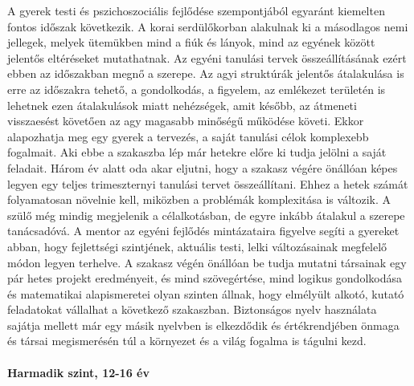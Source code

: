 A gyerek testi és pszichoszociális fejlődése szempontjából egyaránt
kiemelten fontos időszak következik. A korai serdülőkorban alakulnak ki a
másodlagos nemi jellegek, melyek ütemükben mind a fiúk és lányok, mind az
egyének között jelentős eltéréseket mutathatnak. Az egyéni tanulási tervek
összeállításának ezért ebben az időszakban megnő a szerepe. Az agyi struktúrák
jelentős átalakulása is erre az időszakra tehető, a gondolkodás, a figyelem, az
emlékezet területén is lehetnek ezen átalakulások miatt nehézségek, amit
később, az átmeneti visszaesést követően az agy magasabb minőségű működése
követi. Ekkor alapozhatja meg egy gyerek a tervezés, a saját tanulási célok
komplexebb fogalmait. Aki ebbe a szakaszba lép már hetekre előre ki tudja
jelölni a saját feladait. Három év alatt oda akar eljutni, hogy a szakasz
végére önállóan képes legyen egy teljes trimeszternyi tanulási tervet
összeállítani. Ehhez a hetek számát folyamatosan növelnie kell, miközben a
problémák komplexitása is változik. A szülő még mindig megjelenik a
célalkotásban, de egyre inkább átalakul a szerepe tanácsadóvá. A mentor az
egyéni fejlődés mintázataira figyelve segíti a gyereket abban, hogy fejlettségi
szintjének, aktuális testi, lelki változásainak megfelelő módon legyen
terhelve.
A szakasz végén önállóan be tudja mutatni társainak egy pár hetes projekt
eredményeit, és mind szövegértése, mind logikus gondolkodása és matematikai
alapismeretei olyan szinten állnak, hogy elmélyült alkotó, kutató feladatokat
vállalhat a következő szakaszban. Biztonságos nyelv használata sajátja mellett
már egy másik nyelvben is elkezdődik és értékrendjében önmaga és társai
megismerésén túl a környezet és a világ fogalma is tágulni kezd.

\paragraph{Harmadik szint, 12-16 év}

